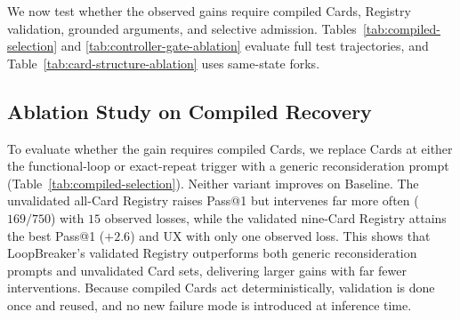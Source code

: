 \documentclass[letterpaper]{article}
\begin{document}
We now test whether the observed gains require compiled Cards, Registry validation, grounded arguments, and selective admission. Tables~\ref{tab:compiled-selection} and \ref{tab:controller-gate-ablation} evaluate full test trajectories, and Table~\ref{tab:card-structure-ablation} uses same-state forks.

\subsection*{Ablation Study on Compiled Recovery}

To evaluate whether the gain requires compiled Cards, we replace Cards at either the functional-loop or exact-repeat trigger with a generic reconsideration prompt (Table~\ref{tab:compiled-selection}). Neither variant improves on Baseline. The unvalidated all-Card Registry raises Pass@1 but intervenes far more often ($169/750$) with $15$ observed losses, while the validated nine-Card Registry attains the best Pass@1 ($+2.6$) and UX with only one observed loss. This shows that LoopBreaker's validated Registry outperforms both generic reconsideration prompts and unvalidated Card sets, delivering larger gains with far fewer interventions. Because compiled Cards act deterministically, validation is done once and reused, and no new failure mode is introduced at inference time.

\begin{table}[!t]
\centering
\small
\renewcommand{\arraystretch}{1.05}
\setlength{\tabcolsep}{2.5pt}
\renewcommand{\arraystretch}{1.0}
\caption{Recovery and Registry ablation on STATE-Bench with DeepSeek-v4-Flash. $\Delta$ is relative to Baseline; triggered diagnostics use matched task-runs. Each variant contains $750$ test trajectories. Bold marks the best value per column.}
\label{tab:compiled-selection}
\end{table}
\end{document}
